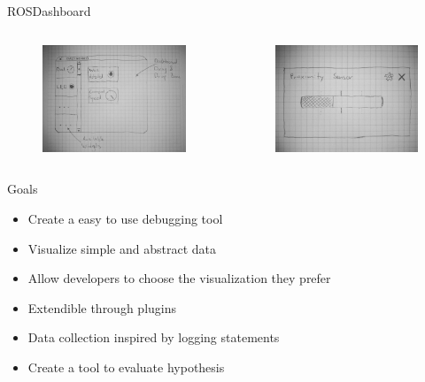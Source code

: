 \documentclass[compress]{beamer}
\begin{document}
\begin{frame}{ROSDashboard}
\begin{columns}
\begin{column}{.4\textwidth}
\begin{figure}[t]
    \centering
    \includegraphics[width=\textwidth]{images/initial_gui_mockup.jpg}
\end{figure}
\end{column}
\begin{column}{.4\textwidth}
\begin{figure}[t]
    \centering
    \includegraphics[width=.6\textwidth]{images/initial_widget_mockup.jpg}
\end{figure}
\end{column}
\end{columns}
\end{frame}

\begin{frame}{Goals}
\begin{itemize}
\item Create a easy to use debugging tool
\item Visualize simple and abstract data
\item Allow developers to choose the visualization they prefer
\item Extendible through plugins
\item Data collection inspired by logging statements
\item Create a tool to evaluate hypothesis
\end{itemize}
\end{frame}
\end{document}
